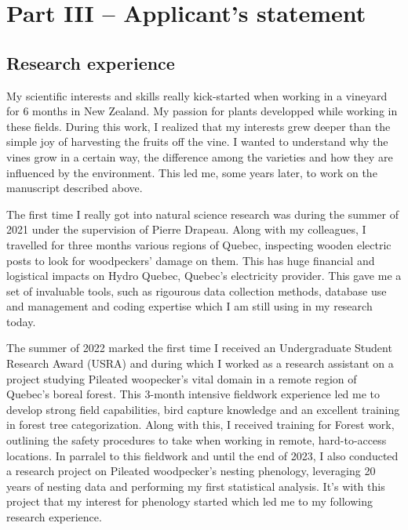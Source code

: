 \documentclass{article}
\begin{document}
\section*{Part III – Applicant’s statement}

\subsection*{Research experience}
My scientific interests and skills really kick-started when working in a vineyard for 6 months in New Zealand. My passion for plants developped while working in these fields. During this work, I realized that my interests grew deeper than the simple joy of harvesting the fruits off the vine. I wanted to understand why the vines grow in a certain way, the difference among the varieties and how they are influenced by the environment. This led me, some years later, to work on the manuscript described above. 

The first time I really got into natural science research was during the summer of 2021 under the supervision of Pierre Drapeau. Along with my colleagues, I travelled for three months various regions of Quebec, inspecting wooden electric posts to look for woodpeckers' damage on them. This has huge financial and logistical impacts on Hydro Quebec, Quebec's electricity provider. This gave me a set of invaluable tools, such as rigourous data collection methods, database use and management and coding expertise which I am still using in my research today.

The summer of 2022 marked the first time I received an Undergraduate Student Research Award (USRA) and during which I worked as a research assistant on a project studying Pileated woopecker's vital domain in a remote region of Quebec's boreal forest. This 3-month intensive fieldwork experience led me to develop strong field capabilities, bird capture knowledge and an excellent training in forest tree categorization. Along with this, I received training for Forest work, outlining the safety procedures to take when working in remote, hard-to-access locations. In parralel to this fieldwork and until the end of 2023, I also conducted a research project on Pileated woodpecker's nesting phenology, leveraging 20 years of nesting data and performing my first statistical analysis. It's with this project that my interest for phenology started which led me to my following research experience.
\end{document}
